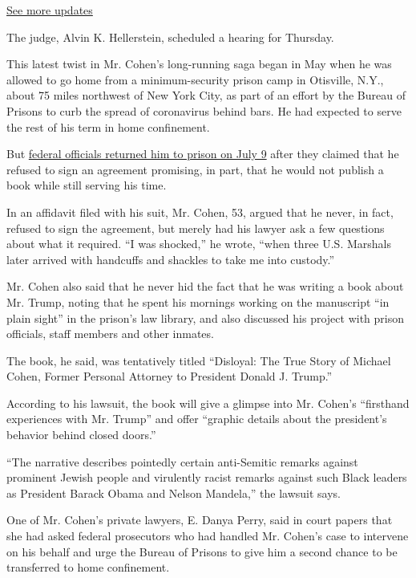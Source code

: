 \href{https://www.nytimes.com/2020/08/03/us/elections/biden-vs-trump.html?action=click\&pgtype=Article\&state=default\&region=MAIN_CONTENT_1\&context=storylines_live_updates}{See
more updates}

The judge, Alvin K. Hellerstein, scheduled a hearing for Thursday.

This latest twist in Mr. Cohen's long-running saga began in May when he
was allowed to go home from a minimum-security prison camp in Otisville,
N.Y., about 75 miles northwest of New York City, as part of an effort by
the Bureau of Prisons to curb the spread of coronavirus behind bars. He
had expected to serve the rest of his term in home confinement.

But
\href{https://www.nytimes.com/2020/07/09/nyregion/michael-cohen-arrested.html}{federal
officials returned him to prison on July 9} after they claimed that he
refused to sign an agreement promising, in part, that he would not
publish a book while still serving his time.

In an affidavit filed with his suit, Mr. Cohen, 53, argued that he
never, in fact, refused to sign the agreement, but merely had his lawyer
ask a few questions about what it required. ``I was shocked,'' he wrote,
``when three U.S. Marshals later arrived with handcuffs and shackles to
take me into custody.''

Mr. Cohen also said that he never hid the fact that he was writing a
book about Mr. Trump, noting that he spent his mornings working on the
manuscript ``in plain sight'' in the prison's law library, and also
discussed his project with prison officials, staff members and other
inmates.

The book, he said, was tentatively titled ``Disloyal: The True Story of
Michael Cohen, Former Personal Attorney to President Donald J. Trump.''

According to his lawsuit, the book will give a glimpse into Mr. Cohen's
``firsthand experiences with Mr. Trump'' and offer ``graphic details
about the president's behavior behind closed doors.''

``The narrative describes pointedly certain anti-Semitic remarks against
prominent Jewish people and virulently racist remarks against such Black
leaders as President Barack Obama and Nelson Mandela,'' the lawsuit
says.

One of Mr. Cohen's private lawyers, E. Danya Perry, said in court papers
that she had asked federal prosecutors who had handled Mr. Cohen's case
to intervene on his behalf and urge the Bureau of Prisons to give him a
second chance to be transferred to home confinement.


